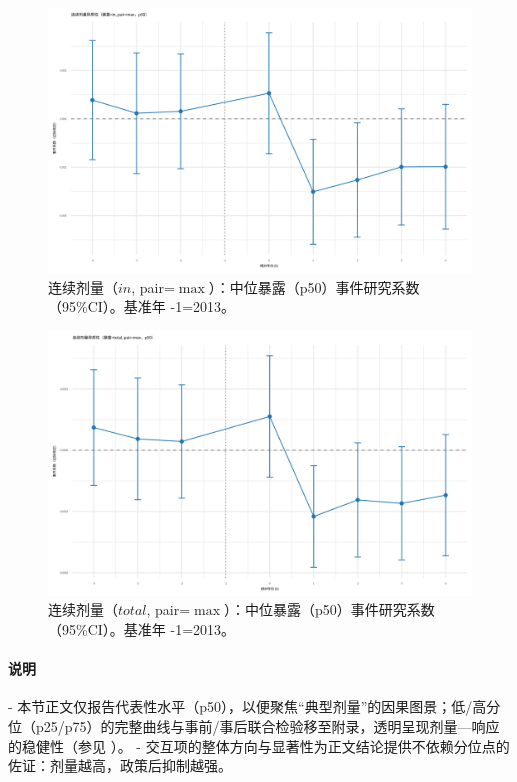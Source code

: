 \begin{figure}[!htbp]
  \centering
  \includegraphics[width=0.85\linewidth]{figures/PT_exposure_cont_in_max_cont_p50.png}
  \caption{连续剂量（\(in\), pair=\(\max\)）：中位暴露（p50）事件研究系数（95\%CI）。基准年 -1=2013。}
  \label{fig:hetero_expo_cont_in_p50}
\end{figure}

\begin{figure}[!htbp]
  \centering
  \includegraphics[width=0.85\linewidth]{figures/PT_exposure_cont_total_max_cont_p50.png}
  \caption{连续剂量（\(total\), pair=\(\max\)）：中位暴露（p50）事件研究系数（95\%CI）。基准年 -1=2013。}
  \label{fig:hetero_expo_cont_total_p50}
\end{figure}

\paragraph{说明}
- 本节正文仅报告代表性水平（p50），以便聚焦“典型剂量”的因果图景；低/高分位（p25/p75）的完整曲线与事前/事后联合检验移至附录，透明呈现剂量—响应的稳健性（参见 \citet{sun2021event}）。
- 交互项的整体方向与显著性为正文结论提供不依赖分位点的佐证：剂量越高，政策后抑制越强。


